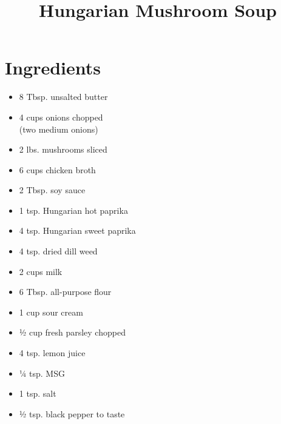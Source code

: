 \documentclass[11pt,letterpaper]{article}
\title{Hungarian Mushroom Soup}
\author{}
\date{}
\begin{document}
\maketitle

\section*{Ingredients}
\begin{multicols}{2}
    \begin{itemize}
        \item 8 Tbsp. unsalted butter
        \item 4 cups onions chopped \\ (two medium onions)
        \item 2 lbs. mushrooms sliced
        \item 6 cups chicken broth
        \item 2 Tbsp. soy sauce
        \item 1 tsp. Hungarian hot paprika
        \item 4 tsp. Hungarian sweet paprika
        \item 4 tsp. dried dill weed
    \end{itemize}
    \columnbreak
    \begin{itemize}
        \item 2 cups milk
        \item 6 Tbsp. all-purpose flour
        \item 1 cup sour cream
        \item ½ cup fresh parsley chopped 
        \item 4 tsp. lemon juice
        \item ¼ tsp. MSG
        \item 1 tsp. salt
        \item ½ tsp. black pepper to taste
    \end{itemize}
\end{multicols}
\end{document}
